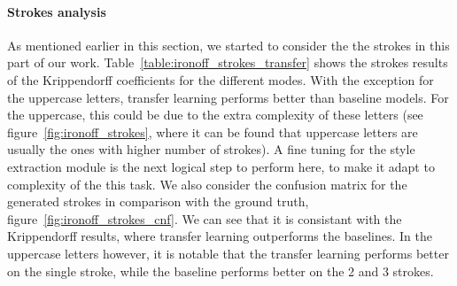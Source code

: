     \paragraph{Strokes analysis}
    As mentioned earlier in this section, we started to consider the the strokes in this part of our work. Table~\ref{table:ironoff_strokes_transfer} shows the strokes results of the Krippendorff coefficients for the different modes. With the exception for the uppercase letters, transfer learning performs better than baseline models. For the uppercase, this could be due to the extra complexity of these letters (see figure~\ref{fig:ironoff_strokes}, where it can be found that uppercase letters are usually the ones with higher number of strokes). A fine tuning for the style extraction module is the next logical step to perform here, to make it adapt to complexity of the this task. We also consider the confusion matrix for the generated strokes in comparison with the ground truth, figure~\ref{fig:ironoff_strokes_cnf}. We can see that it is consistant with the Krippendorff results, where transfer learning outperforms the baselines. In the uppercase letters however, it is notable that the transfer learning performs better on the single stroke, while the baseline performs better on the 2 and 3 strokes.

